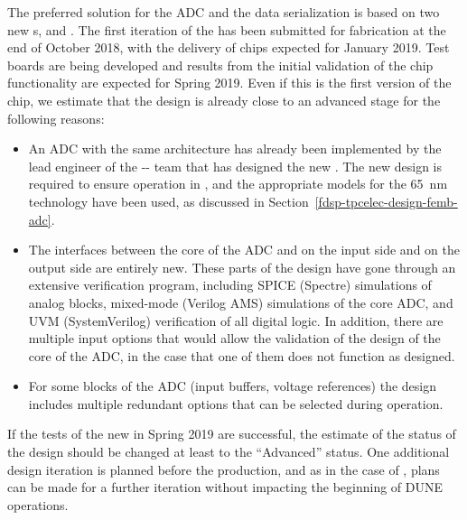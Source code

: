 The preferred solution for the ADC and the data serialization is based on two new 
s,  and .
The first iteration of the  has been submitted for fabrication
at the end of October 2018, with the delivery of chips expected for January 2019.
Test boards are being developed and results from the initial validation of the
chip functionality are expected for Spring 2019. Even if this is the first version
of the chip, we estimate that the design is already close to an advanced stage
for the following reasons:
\begin{itemize}
\item{An ADC with the same architecture has already been implemented by the
lead engineer of the -- team that has designed the new .
The new design is required to ensure operation in \lar, and the appropriate
models for the \SI{65}{nm} technology have been used, as discussed in
Section~\ref{fdsp-tpcelec-design-femb-adc}.}
\item{The interfaces between the core of the ADC and  on 
the input side and  on the output side are entirely new.
These parts of the design have gone through an extensive verification
program, including SPICE (Spectre) simulations of analog blocks,
mixed-mode (Verilog AMS) simulations of the core ADC, and
UVM (SystemVerilog) verification of all digital logic. In addition, there are multiple 
input options that would allow the validation of the design of the core 
of the ADC, in the case that one of them does not function as designed.}
\item{For some blocks of the ADC (input buffers, voltage references) the
design includes multiple redundant options that can be selected during 
operation.}
\end{itemize}
If the tests of the new  in Spring 2019 are successful, the
estimate of the status of the design should be changed at least to the 
``Advanced'' status. One additional design iteration is planned before
the production, and as in the case of , plans can be made for a
further iteration without impacting the beginning of DUNE operations.

